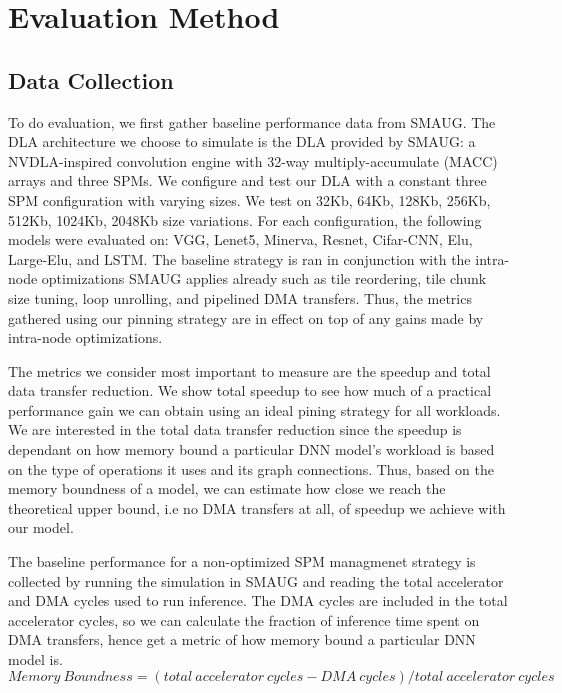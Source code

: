 \chapter{Evaluation Method} %

\label{Chapter5} %

\section{Data Collection}
To do evaluation, we first gather baseline performance data from SMAUG. The DLA architecture we
choose to simulate is the DLA provided by SMAUG: a NVDLA-inspired convolution engine with
32-way multiply-accumulate (MACC) arrays and three SPMs. We configure and test our DLA with
a constant three SPM configuration with varying sizes. We test on 32Kb, 64Kb, 128Kb, 256Kb,
512Kb, 1024Kb, 2048Kb size variations. For each configuration, the following models were
evaluated on: VGG, Lenet5, Minerva, Resnet, Cifar-CNN, Elu, Large-Elu, and LSTM. The baseline
strategy is ran in conjunction with the intra-node optimizations SMAUG applies already such
as tile reordering, tile chunk size tuning, loop unrolling, and pipelined DMA transfers. Thus,
the metrics gathered using our pinning strategy are in effect on top of any gains made by
intra-node optimizations.

The metrics we consider most important to measure are the speedup and total
data transfer reduction. We show total speedup to see how much of a practical
performance gain we can obtain using an ideal pining strategy for all workloads.
We are interested in the total data transfer reduction since the speedup is 
dependant on how memory bound a particular DNN model's workload is based on the type
of operations it uses and its graph connections. Thus, based on the memory boundness
of a model, we can estimate how close we reach the theoretical upper bound, i.e
no DMA transfers at all, of speedup we achieve with our model.

The baseline performance for a non-optimized SPM managmenet strategy is
collected by running the simulation in SMAUG and reading the total accelerator
and DMA cycles used to run inference. The DMA cycles are included in the total
accelerator cycles, so we can calculate the fraction of inference time spent on
DMA transfers, hence get a metric of how memory bound a particular DNN model
is.
\[
    Memory\ Boundness = (total\ accelerator\ cycles - DMA\ cycles) / total\ accelerator\ cycles
\]

